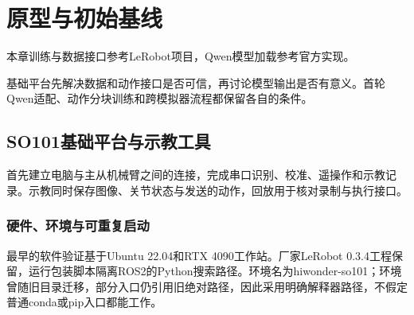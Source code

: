 \chapter{原型与初始基线}
本章训练与数据接口参考LeRobot项目\cite{lerobot}，Qwen模型加载参考官方实现\cite{qwen}。


基础平台先解决数据和动作接口是否可信，再讨论模型输出是否有意义。首轮Qwen适配、动作分块训练和跨模拟器流程都保留各自的条件。

\section{SO101基础平台与示教工具}

\label{stage:s01}

首先建立电脑与主从机械臂之间的连接，完成串口识别、校准、遥操作和示教记录。示教同时保存图像、关节状态与发送的动作，回放用于核对录制与执行接口。

\subsection{硬件、环境与可重复启动}\label{s01-detail-1}

最早的软件验证基于Ubuntu 22.04和RTX 4090工作站。厂家LeRobot 0.3.4工程保留，运行包装脚本隔离ROS2的Python搜索路径。环境名为hiwonder-so101；环境曾随旧目录迁移，部分入口仍引用旧绝对路径，因此采用明确解释器路径，不假定普通conda或pip入口都能工作。

